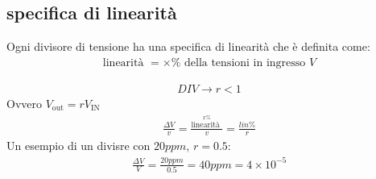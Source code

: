 \documentclass[a4paper, oneside]{article}
\begin{document}
\subsection{specifica di linearità}
Ogni divisore di tensione ha una specifica di linearità che è definita come:
\begin{gather*}
    \text{linearità } = \times \% \text{ della tensioni in ingresso } V
\end{gather*}

\begin{gather*}
    DIV \to r < 1
\end{gather*}
Ovvero $V_\text{out} = r V_\text{IN}$
\begin{gather*}
    \frac{\Delta V}{v} = \frac{\overset{x \%}{\text{linearità }}}{v} = \frac{lin \%}{r}
\end{gather*}
Un esempio di un divisre con $20 ppm$, $r=0.5$:
\begin{gather*}
    \frac{\Delta V}{V} = \frac{20 ppm}{0.5} = 40 ppm = 4 \times 10^{-5}
\end{gather*}
\end{document}
